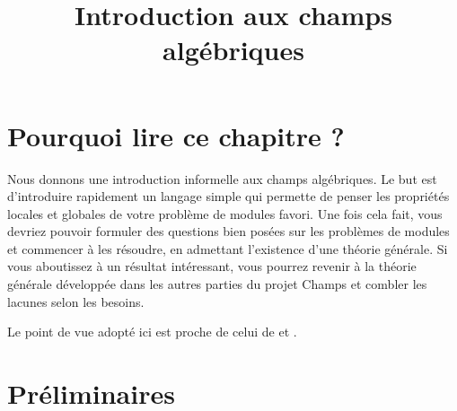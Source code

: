 

%


\title{Introduction aux champs algébriques}

\maketitle

\label{section-phantom}

\tableofcontents




\section{Pourquoi lire ce chapitre ?}
\label{section-introduction}

\noindent
Nous donnons une introduction informelle aux champs algébriques. Le but est
d'introduire rapidement un langage simple qui permette de penser les
propriétés locales et globales de votre problème de modules favori.
Une fois cela fait, vous devriez pouvoir formuler des questions bien posées
sur les problèmes de modules et commencer à les résoudre, en admettant
l'existence d'une théorie générale. Si vous aboutissez à un résultat
intéressant, vous pourrez revenir à la théorie générale développée dans les
autres parties du projet Champs et combler les lacunes selon les besoins.

\medskip\noindent
Le point de vue adopté ici est proche de celui de
\cite{KatzMazur} et \cite{mumford_picard}.






\section{Préliminaires}
\label{section-preliminary}


